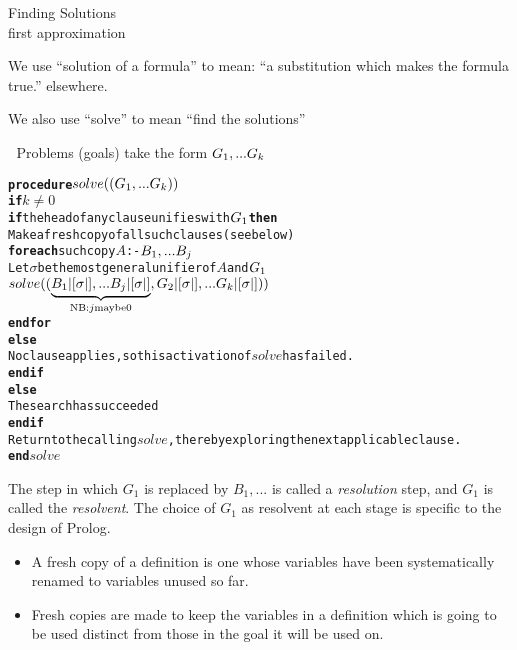 \documentclass{popl}
\newenvironment{smalltt}{\begin{alltt}\smaller}{\end{alltt}}
\begin{document}
\begin{foil} 
\begin{cframed}
Finding Solutions\\{\smaller first approximation}
\end{cframed}
\begin{note}
We use ``solution of a formula'' to mean: 
``a substitution which makes the formula true.''
elsewhere.

We also use ``solve'' to mean ``find the solutions''
\end{note}

Problems (goals) take the form \(G\sb1, ... G\sb{k}\)

\begin{smalltt}\rm
\textbf{procedure} \(solve((G\sb1, ... G\sb{k}))\)
   \textbf{if} \(k\neq 0\)
      \textbf{if} the head of any clause unifies with \(G\sb1\) \textbf{then}
          Make a fresh copy of all such clauses (see below)
          \textbf{for each} such copy \(A\){ :-} \(B\sb1, ... B\sb{j}\)
              Let \(\sigma\) be the most general unifier of \(A\) and \(G\sb1\)
                 \(solve((\underbrace{B\sb1|[\sigma|], ... B\sb{j}|[\sigma|]}\sb{\mathrm{NB:} j \mathrm{may be} 0}, G\sb2|[\sigma|], ... G\sb{k}|[\sigma|]))\) 
          \textbf{end for}
      \textbf{else}
          No clause applies, so this activation of \(solve\) has failed.
      \textbf{end if}
   \textbf{else}
      The search has succeeded
   \textbf{end if}
   Return to the calling \(solve\), thereby exploring the next applicable clause. 
\textbf{end} \(solve\)
\end{smalltt}
\begin{note}
The step in which $G_1$ is replaced by $B_1, ...$ is called a {\it resolution} 
step, and $G_1$ is called the {\it resolvent}. 
The choice of $G_1$ as resolvent at each stage is specific to the 
design of Prolog. 
\end{note}

\begin{itemize}
\item A fresh copy of a definition is one whose variables have been systematically renamed to
variables unused so far.
\item Fresh copies are made to keep the variables in a definition which is going to
be used distinct from those in the goal it will be used on.
\end{itemize}
\end{foil}
\end{document}
